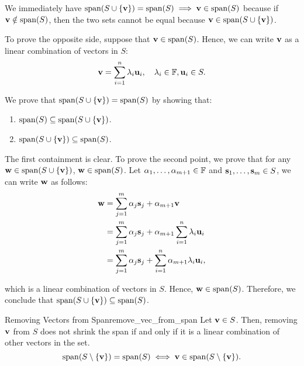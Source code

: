 \begin{proof*}
	We immediately have $\mathrm{span} (S\cup\{{\bf v}\}) = \mathrm{span} (S) \implies {\bf v}\in\mathrm{span}(S)$	because if ${\bf v}\notin\mathrm{span}(S)$, then the two sets cannot be equal because ${\bf v}\in\mathrm{span}(S\cup\{{\bf v}\})$.

	\noindent\newline To prove the opposite side, suppose that ${\bf v}\in\mathrm{span}(S)$. Hence, we can write ${\bf v}$ as a linear combination of vectors in $S$:
	\begin{align*}
		{\bf v} = \sum_{i=1}^n \lambda_i {\bf u}_i, \quad \lambda_i \in \mathbb{F}, {\bf u}_i \in S.	
	\end{align*} 

	\noindent We prove that $\mathrm{span} (S\cup\{{\bf v}\}) = \mathrm{span}(S)$ by showing that: 
	\begin{enumerate}
		\item $\mathrm{span} (S)\subseteq \mathrm{span} (S\cup\{{\bf v}\})$.
		\item $\mathrm{span} (S\cup\{{\bf v}\})\subseteq \mathrm{span} (S)$.
	\end{enumerate} 

	\noindent The first containment is clear. To prove the second point, we prove that for any ${\bf w} \in \mathrm{span}(S\cup\{{\bf v}\})$, ${\bf w}\in\mathrm{span}(S)$. Let $\alpha_1, \dots, \alpha_{m+1} \in \mathbb{F}$ and ${\bf s}_1, \dots, {\bf s}_m \in S$, we can write ${\bf w}$ as follows:
	\begin{align*}
		{\bf w} &= \sum_{j=1}^m \alpha_j {\bf s}_j + \alpha_{m+1}{\bf v} \\
			&= \sum_{j=1}^m \alpha_j {\bf s}_j + \alpha_{m+1}\sum_{i=1}^n \lambda_i {\bf u}_i \\
			&= \sum_{j=1}^m \alpha_j {\bf s}_j + \sum_{i=1}^n \alpha_{m+1}\lambda_i {\bf u}_i,
	\end{align*} 

	\noindent which is a linear combination of vectors in $S$. Hence, ${\bf w}\in\mathrm{span}(S)$. Therefore, we conclude that $\mathrm{span}(S\cup\{{\bf v}\}) \subseteq \mathrm{span}(S)$.
\end{proof*} 


\begin{proposition}{Removing Vectors from Span}{remove_vec_from_span}
	Let ${\bf v}\in S$. Then, removing ${\bf v}$ from $S$ does not shrink the span if and only if it is a linear combination of other vectors in the set.
	\begin{equation}
		\mathrm{span}(S\setminus\{{\bf v}\}) = \mathrm{span}(S) \iff {\bf v} \in \mathrm{span}(S\setminus\{{\bf v}\}).	
	\end{equation} 
\end{proposition} 

